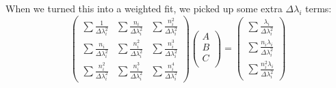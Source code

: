 \documentclass[12pt,twoside]{reedthesis}
\newcommand{\eqn}[1]{\begin{equation}#1\end{equation}}
\begin{document}
When we turned this into a weighted fit, we picked up some extra $\Delta \lambda_i$ terms:
\eqn{
\left(
\begin{array}{ccc}
\sum \frac{1}{\Delta \lambda_i^2} & \sum \frac{n_i}{\Delta \lambda_i^2} &  \sum \frac{n_i^2}{\Delta \lambda_i^2} \\
\sum \frac{n_i}{\Delta \lambda_i^2} & \sum \frac{n_i ^2}{\Delta \lambda_i^2} & \sum \frac{n_i^3}{\Delta \lambda_i^2} \\
\sum \frac{n_i ^2}{\Delta \lambda_i^2} & \sum \frac{n_i^3}{\Delta \lambda_i^2} & \sum \frac{n_i ^4}{\Delta \lambda_i^2}
\end{array}
\right)
\left(
\begin{array}{c}
A \\
B \\
C \\
\end{array}
\right)
=
\left(
\begin{array}{c}
\sum \frac{\lambda_i}{\Delta \lambda_i^2} \\
\sum \frac{n_i \lambda_i}{\Delta \lambda_i^2} \\
\sum \frac{n_i^2 \lambda_i}{\Delta \lambda_i^2}
\end{array}
\right)
}
\end{document}
